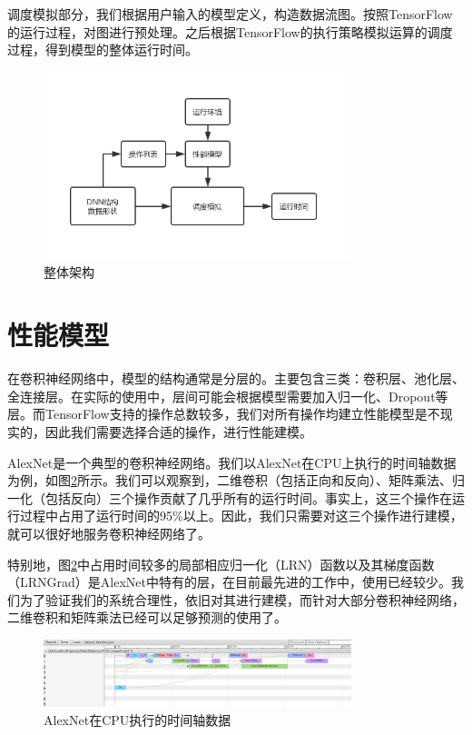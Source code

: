     调度模拟部分，我们根据用户输入的模型定义，构造数据流图。按照TensorFlow的运行过程，对图进行预处理。之后根据TensorFlow的执行策略模拟运算的调度过程，得到模型的整体运行时间。

    \begin{figure}[!htbp]
        \centering
        \includegraphics[width=0.8\textwidth]{figures/arch.jpg}
        \caption{整体架构}
        \label{fig:arch}
    \end{figure}


\section{性能模型}
    在卷积神经网络中，模型的结构通常是分层的。主要包含三类：卷积层、池化层、全连接层。在实际的使用中，层间可能会根据模型需要加入归一化、Dropout等层。而TensorFlow支持的操作总数较多，我们对所有操作均建立性能模型是不现实的，因此我们需要选择合适的操作，进行性能建模。
    
    AlexNet\cite{alexnet}是一个典型的卷积神经网络。我们以AlexNet在CPU上执行的时间轴数据为例，如图\ref{fig:alexnet_timeline}所示。我们可以观察到，二维卷积（包括正向和反向）、矩阵乘法、归一化（包括反向）三个操作贡献了几乎所有的运行时间。事实上，这三个操作在运行过程中占用了运行时间的95\%以上。因此，我们只需要对这三个操作进行建模，就可以很好地服务卷积神经网络了。
    
    特别地，图\ref{fig:alexnet_timeline}中占用时间较多的局部相应归一化（LRN）函数以及其梯度函数（LRNGrad）是AlexNet中特有的层，在目前最先进的工作中，使用已经较少。我们为了验证我们的系统合理性，依旧对其进行建模，而针对大部分卷积神经网络，二维卷积和矩阵乘法已经可以足够预测的使用了。

    \begin{figure}[!htbp]
        \centering
        \includegraphics[width=0.8\textwidth]{figures/alexnet_timeline.png}
        \caption{AlexNet在CPU执行的时间轴数据}
        \label{fig:alexnet_timeline}
    \end{figure}


